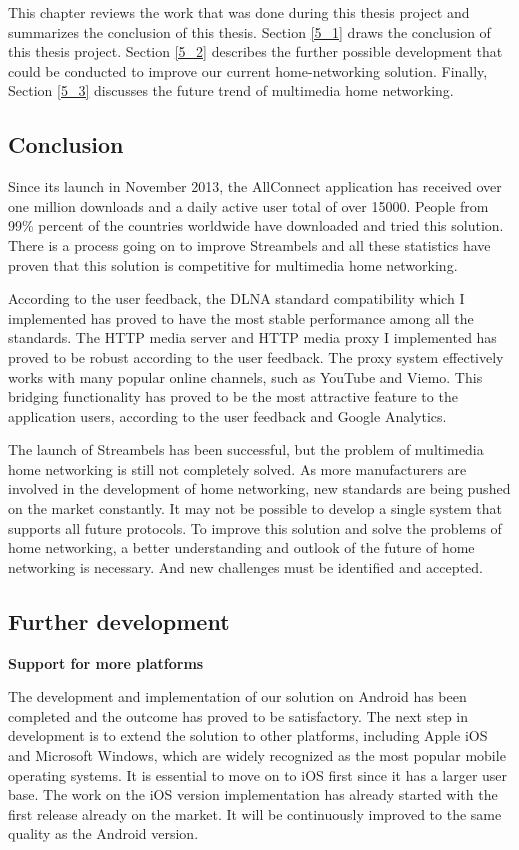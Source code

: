 This chapter reviews the work that was done during this thesis project and
summarizes the conclusion of this thesis. Section \ref{5_1} draws the
conclusion of this thesis project. Section \ref{5_2} describes the further
possible development that could be conducted to improve our current
home-networking solution. Finally, Section \ref{5_3} discusses the future trend
of multimedia home networking.
\subsection{Conclusion\label{5_1}}
Since its launch in November 2013, the AllConnect application has received over
one million downloads and a daily active user total of over 15000. People from 99\%
percent of the countries worldwide have downloaded and tried this solution.
There is a process going on to improve Streambels and all these
statistics have proven that this solution is competitive for multimedia home
networking.

According to the user feedback, the DLNA standard compatibility which I
implemented has proved to have the most stable performance among all the
standards. The HTTP media server and HTTP media proxy I implemented has proved
to be robust according to the user feedback. The proxy system effectively works
with many popular online channels, such as YouTube and Viemo. This bridging
functionality has proved to be the most attractive feature to the application
users, according to the user feedback and Google Analytics.

The launch of Streambels has been successful, but the problem of multimedia home
networking is still not completely solved. As more manufacturers are involved
in the development of home networking, new standards are being pushed on the
market constantly. It may not be possible to develop a single system that
supports all future protocols. To improve this solution and solve the problems
of home networking, a better understanding and outlook of the future of home
networking is necessary. And new challenges must be identified and accepted.
\clearpage
\subsection{Further development\label{5_2}}
\textbf{Support for more platforms}

The development and implementation of our solution on Android has been completed
and the outcome has proved to be satisfactory. The next step in development is
to extend the solution to other platforms, including Apple iOS and Microsoft
Windows, which are widely recognized as the most popular mobile operating
systems. It is essential to move on to iOS first since it has a larger user
base. The work on the iOS version implementation has already started with the
first release already on the market. It will be continuously improved
to the same quality as the Android version.

